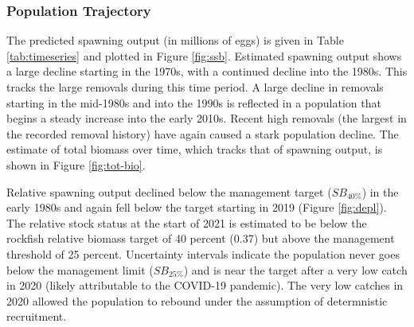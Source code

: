 \documentclass[11pt,
  english,
  a4paper,
]{article}
\begin{document}
\leavevmode\tagmcend\tagstructend\par


\hypertarget{population-trajectory}{%
\subsubsection{Population Trajectory}\label{population-trajectory}}

\leavevmode\tagmcend\tagstructend


The predicted spawning output (in millions of eggs) is given in Table \ref{tab:timeseries} and plotted in Figure \ref{fig:ssb}. Estimated spawning output shows a large decline starting in the 1970s, with a continued decline into the 1980s. This tracks the large removals during this time period. A large decline in removals starting in the mid-1980s and into the 1990s is reflected in a population that begins a steady increase into the early 2010s. Recent high removals (the largest in the recorded removal history) have again caused a stark population decline. The estimate of total biomass over time, which tracks that of spawning output, is shown in Figure \ref{fig:tot-bio}.

\leavevmode\tagmcend\tagstructend\par


Relative spawning output declined below the management target ({\(SB_{40\%}\)\leavevmode\tagmcend\tagstructend}) in the early 1980s and again fell below the target starting in 2019 (Figure \ref{fig:depl}). The relative stock status at the start of 2021 is estimated to be below the rockfish relative biomass target of 40 percent (0.37) but above the management threshold of 25 percent. Uncertainty intervals indicate the population never goes below the management limit ({\(SB_{25\%}\)\leavevmode\tagmcend\tagstructend}) and is near the target after a very low catch in 2020 (likely attributable to the COVID-19 pandemic). The very low catches in 2020 allowed the population to rebound under the assumption of determnistic recruitment.

\leavevmode\tagmcend\tagstructend\par

\end{document}
